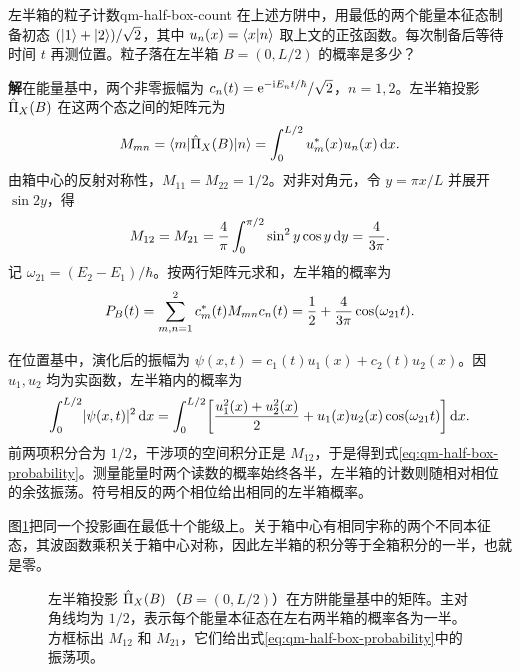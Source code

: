 \begin{example}{左半箱的粒子计数}{qm-half-box-count}
    在上述方阱中，用最低的两个能量本征态制备初态 $(\lvert1\rangle + \lvert2\rangle)/\sqrt2$，其中 $u_n(x) = \langle x\vert n\rangle$ 取上文的正弦函数。每次制备后等待时间 $t$ 再测位置。粒子落在左半箱 $B = (0,L/2)$ 的概率是多少？

    \par\smallskip\textbf{解}\quad 在能量基中，两个非零振幅为 $c_n(t) = \mathop{}\!\mathrm{e}^{-\mathrm{i} E_nt/\hbar}/\sqrt2$，$n = 1,2$。左半箱投影 $\hat{\Pi}_X(B)$ 在这两个态之间的矩阵元为
    \[
        M_{mn} = \langle m\vert\hat{\Pi}_X(B)\vert n\rangle = \int_0^{L/2} u_m^\ast(x)u_n(x)\mathop{}\!\mathrm{d} x .
    \]
    由箱中心的反射对称性，$M_{11} = M_{22} = 1/2$。对非对角元，令 $y = \pi x/L$ 并展开 $\sin 2y$，得
    \[
        M_{12} = M_{21} = \frac4\pi\int_0^{\pi/2}\sin^2 y\cos y\mathop{}\!\mathrm{d} y = \frac{4}{3\pi}.
    \]
    记 $\omega_{21} = (E_2 - E_1)/\hbar$。按两行矩阵元求和，左半箱的概率为
    \begin{equation}\label{eq:qm-half-box-probability}
        P_B(t) = \sum_{m,n=1}^2 c_m^\ast(t)M_{mn}c_n(t)
        = \frac12 + \frac{4}{3\pi}\cos(\omega_{21}t).
    \end{equation}

    在位置基中，演化后的振幅为 $\psi(x,t) = c_1(t)u_1(x) + c_2(t)u_2(x)$。因 $u_1,u_2$ 均为实函数，左半箱内的概率为
    \[
        \int_0^{L/2}\lvert\psi(x,t)\rvert^2\mathop{}\!\mathrm{d} x
        = \int_0^{L/2}\biggl[\frac{u_1^2(x) + u_2^2(x)}{2}
                           + u_1(x)u_2(x)\cos(\omega_{21}t)\biggr]\mathop{}\!\mathrm{d} x .
    \]
    前两项积分合为 $1/2$，干涉项的空间积分正是 $M_{12}$，于是得到式\eqref{eq:qm-half-box-probability}。测量能量时两个读数的概率始终各半，左半箱的计数则随相对相位的余弦振荡。符号相反的两个相位给出相同的左半箱概率。
\end{example}

图\ref{fig:qm-half-box-projector}把同一个投影画在最低十个能级上。关于箱中心有相同宇称的两个不同本征态，其波函数乘积关于箱中心对称，因此左半箱的积分等于全箱积分的一半，也就是零。

\begin{figure}[htbp]
    \centering
    \caption{左半箱投影 $\hat{\Pi}_X(B)$（$B = (0,L/2)$）在方阱能量基中的矩阵。主对角线均为 $1/2$，表示每个能量本征态在左右两半箱的概率各为一半。方框标出 $M_{12}$ 和 $M_{21}$，它们给出式\eqref{eq:qm-half-box-probability}中的振荡项。}
    \label{fig:qm-half-box-projector}
\end{figure}

